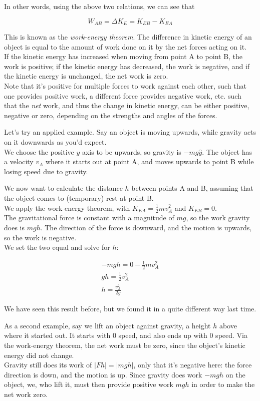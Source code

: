 In other words, using the above two relations, we can see that

\begin{equation}
W_{AB} = \Delta K_E = K_{EB} - K_{EA}
\end{equation}

This is known as the \emph{work-energy theorem}. The difference in kinetic energy of an object is equal to the amount of work done on it by the net forces acting on it.\\
If the kinetic energy has increased when moving from point A to point B, the work is positive; if the kinetic energy has decreased, the work is negative, and if the kinetic energy is unchanged, the net work is zero.\\
Note that it's positive for multiple forces to work against each other, such that one provides positive work, a different force provides negative work, etc. such that the \emph{net} work, and thus the change in kinetic energy, can be either positive, negative or zero, depending on the strengths and angles of the forces.

Let's try an applied example. Say an object is moving upwards, while gravity acts on it downwards as you'd expect.\\
We choose the positive $y$ axis to be upwards, so gravity is $-mg\hat{y}$. The object has a velocity $v_A$ where it starts out at point A, and moves upwards to point B while losing speed due to gravity.

We now want to calculate the distance $h$ between points A and B, assuming that the object comes to (temporary) rest at point B.\\
We apply the work-energy theorem, with $\displaystyle K_{EA} = \frac{1}{2} m v_A^2$ and $K_{EB} = 0$.\\
The gravitational force is constant with a magnitude of $m g$, so the work gravity does is $m g h$. The direction of the force is downward, and the motion is upwards, so the work is negative.\\
We set the two equal and solve for $h$:

\begin{align}
- m g h = 0 - \frac{1}{2} m v_A^2\\
g h = \frac{1}{2} v_A^2\\
h = \frac{v_A^2}{2 g}
\end{align}

We have seen this result before, but we found it in a quite different way last time.

As a second example, say we lift an object against gravity, a height $h$ above where it started out. It starts with 0 speed, and also ends up with 0 speed. Via the work-energy theorem, the net work must be zero, since the object's kinetic energy did not change.\\
Gravity still does its work of $|F h| = |m g h|$, only that it's negative here: the force direction is down, and the motion is up. Since gravity does work $- m g h$ on the object, we, who lift it, must then provide positive work $m g h$ in order to make the net work zero.

